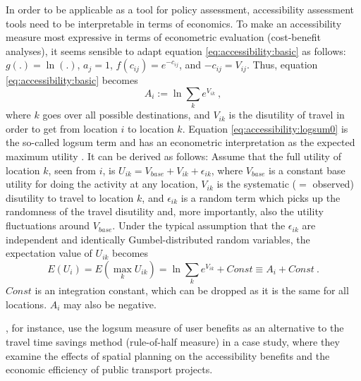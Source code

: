 In order to be applicable as a tool for policy assessment, accessibility assessment tools need to be interpretable in
terms of economics. To make an accessibility measure most expressive in terms of econometric evaluation (\eg cost-benefit 
analyses), it seems sensible to adapt equation \ref{eq:accessibility:basic} as 
follows: $g(.) = \ln(.)$, $a_j = 1$, $f(c_{ij}) = e^{-c_{ij}}$, and $-c_{ij} = V_{ij}$. Thus, 
equation \ref{eq:accessibility:basic} becomes
\begin{equation}
	A_i := \ln \sum_k e^{V_{ik}} \ ,
	\label{eq:accessibility:logsum0}
\end{equation}
where $k$ goes over all possible destinations, and $V_{ik}$ is the
disutility of travel in order to get from location $i$ to location
$k$. Equation \ref{eq:accessibility:logsum0} is the so-called \gls{logsum} term and has an econometric interpretation 
as the expected maximum utility \citep[e.g.,][]{Ben-AkivaBook, DejongEtc2005LogsumAsEvalDutchReport}. It can be 
derived as follows: Assume that the full utility of location $k$, seen 
from $i$, is $U_{ik} = V_{base} + V_{ik} + \epsilon_{ik}$, where $V_{base}$ is a constant 
base utility for doing the activity at any location, $V_{ik}$ is the systematic ($=$ observed) disutility to travel to 
location $k$, and $\epsilon_{ik}$ is a random term which picks up the randomness of the travel disutility and, more 
importantly, also the utility fluctuations around $V_{base}$.  Under the typical assumption that the $\epsilon_{ik}$ 
are independent and identically Gumbel-distributed random variables, the expectation value of $U_{ik}$ becomes
\begin{equation}
	E(U_i) = E(\max_k U_{ik}) = \ln \sum_k e^{V_{ik}} + Const \equiv A_i + Const \ .
\end{equation}
$Const$ is an integration constant, which can be dropped as it is the same for all locations. $A_i$ may also be negative.

\citet{GeursEtAl2012AccessibilityBenefitsNetherlands}, for instance, use the \gls{logsum} measure of user benefits 
as an alternative to the travel time savings method (\ie rule-of-half measure) in a case study, where they 
examine the effects of spatial planning on the accessibility benefits and the economic efficiency of public 
transport projects.


